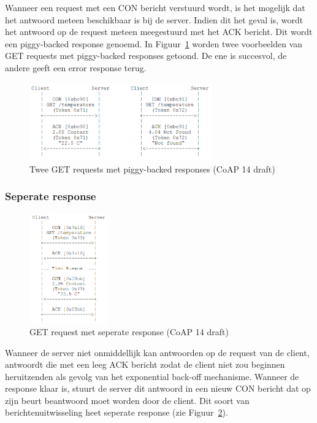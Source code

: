 Wanneer een request met een CON bericht verstuurd wordt, is het mogelijk dat het antwoord meteen beschikbaar is bij de server. Indien dit het geval is, wordt het antwoord op de request meteen meegestuurd met het ACK bericht. Dit wordt een piggy-backed response genoemd. In Figuur~\ref{fig:CoAPPiggyBacked} worden twee voorbeelden van GET requests met piggy-backed responses getoond. De ene is succesvol, de andere geeft een error response terug.
\begin{figure}[h]
\vspace{10pt}
\centering
\includegraphics[width=0.7\textwidth]{fig/CoAPPiggyBacked}
\caption{Twee GET requests met piggy-backed responses (CoAP 14 draft)}
\label{fig:CoAPPiggyBacked}
\vspace{-20pt}
\end{figure}

\newpage

\subsubsection{Seperate response}

\begin{figure}
\vspace{-40pt}
\includegraphics[width=0.3\textwidth]{fig/CoAPSeperateResponse}
\vspace{-30pt}
\caption{GET request met seperate response (CoAP 14 draft)}
\label{fig:SeperateResponse}
\vspace{-100pt}
\end{figure}
Wanneer de server niet onmiddellijk kan antwoorden op de request van de client, antwoordt die met een leeg ACK bericht zodat de client niet zou beginnen heruitzenden als gevolg van het exponential back-off mechanisme. Wanneer de response klaar is, stuurt de server dit antwoord in een nieuw CON bericht dat op zijn beurt beantwoord moet worden door de client. Dit soort van berichtenuitwisseling heet seperate response (zie Figuur~\ref{fig:SeperateResponse}).
\\
\\
\\

